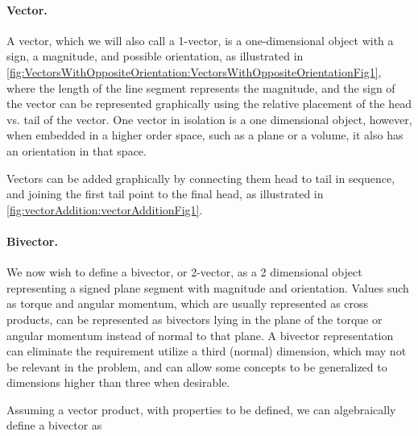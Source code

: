 \paragraph{Vector.}
A vector, which we will also call a 1-vector, is a one-dimensional object with a sign, a magnitude, and possible orientation, as illustrated in
\cref{fig:VectorsWithOppositeOrientation:VectorsWithOppositeOrientationFig1}, where the length of the line segment represents the magnitude, and
the sign of the vector can be represented graphically using the relative placement of the head vs. tail of the vector.
One vector in isolation is a one dimensional object, however, when embedded in a higher order space, such as a plane or a volume, it also has an orientation in that space.

Vectors can be added graphically by connecting them head to tail in sequence, and joining the first tail point to the final head, as
illustrated in
\cref{fig:vectorAddition:vectorAdditionFig1}.

\paragraph{Bivector.}

We now wish to define a bivector, or 2-vector, as a 2 dimensional object representing a signed plane segment with magnitude and orientation.
Values such as torque and angular momentum, which are usually represented as cross products, can be represented as bivectors lying in the plane of the torque or angular momentum instead of normal to that plane.  A bivector representation can eliminate the requirement utilize a third (normal) dimension, which may not be relevant in the problem, and can allow some concepts to be generalized to dimensions higher than three when desirable.

Assuming a vector product, with properties to be defined, we can algebraically define a bivector as


